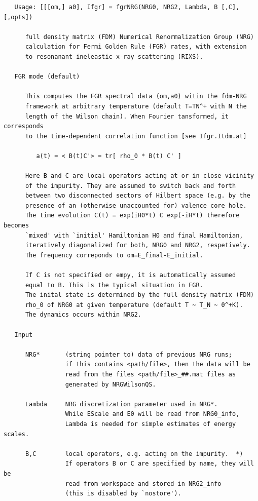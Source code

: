 \documentclass[twoside,12pt]{article}
\begin{document}
\pagebreak[3]



\begin{verbatim}
   Usage: [[[om,] a0], Ifgr] = fgrNRG(NRG0, NRG2, Lambda, B [,C], [,opts])
 
      full density matrix (FDM) Numerical Renormalization Group (NRG)
      calculation for Fermi Golden Rule (FGR) rates, with extension
      to resonanant ineleastic x-ray scattering (RIXS).
 
   FGR mode (default)
 
      This computes the FGR spectral data (om,a0) witin the fdm-NRG
      framework at arbitrary temperature (default T=TN^+ with N the
      length of the Wilson chain). When Fourier tansformed, it corresponds
      to the time-dependent correlation function [see Ifgr.Itdm.at]
 
         a(t) = < B(t)C'> = tr[ rho_0 * B(t) C' ]
 
      Here B and C are local operators acting at or in close vicinity
      of the impurity. They are assumed to switch back and forth
      between two disconnected sectors of Hilbert space (e.g. by the
      presence of an (otherwise unaccounted for) valence core hole.
      The time evolution C(t) = exp(iH0*t) C exp(-iH*t) therefore becomes
      `mixed' with `initial' Hamiltonian H0 and final Hamiltonian,
      iteratively diagonalized for both, NRG0 and NRG2, respetively.
      The frequency correponds to om=E_final-E_initial.
 
      If C is not specified or empy, it is automatically assumed
      equal to B. This is the typical situation in FGR.
      The inital state is determined by the full density matrix (FDM)
      rho_0 of NRG0 at given temperature (default T ~ T_N ~ 0^+K).
      The dynamics occurs within NRG2.
 
   Input
 
      NRG*       (string pointer to) data of previous NRG runs;
                 if this contains <path/file>, then the data will be
                 read from the files <path/file>_##.mat files as
                 generated by NRGWilsonQS.
 
      Lambda     NRG discretization parameter used in NRG*.
                 While EScale and E0 will be read from NRG0_info,
                 Lambda is needed for simple estimates of energy scales.
 
      B,C        local operators, e.g. acting on the impurity.  *)
                 If operators B or C are specified by name, they will be
                 read from workspace and stored in NRG2_info
                 (this is disabled by `nostore').
 

\end{verbatim}
\end{document}
